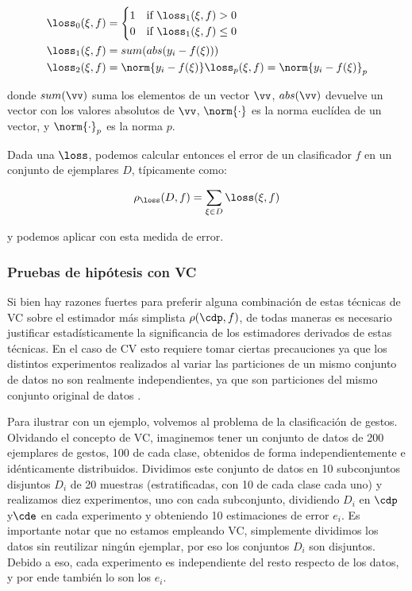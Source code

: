 \begin{align}
  \loss_0(\xi,f) &= \begin{cases}
  1 &\mbox{if } \loss_1(\xi,f) >0 \\  
  0 &\mbox{if } \loss_1(\xi,f) \leq 0      
  \end{cases}\\
  \loss_1(\xi,f) &= sum(abs(y_i-f(\xi))) \\
  \loss_2(\xi,f) &=  \norm{ y_i-f(\xi) } 
  \loss_p(\xi,f) =  \norm{ y_i-f(\xi) }_p 
\end{align}

donde $sum(\vv)$ suma los elementos de un vector $\vv$, $abs(\vv)$ devuelve un vector con los valores absolutos de $\vv$,  $\norm{\cdot}$ es la norma euclídea de un vector, y $\norm{\cdot}_p$ es la norma $p$.

Dada una $\loss$, podemos calcular entonces el error de un clasificador $f$ en un conjunto de ejemplares $D$, típicamente como:

\begin{equation}
\rho_{\loss}(D,f) = \sum_{\xi \in D} \loss(\xi,f)
\end{equation}

y podemos aplicar \cv con esta medida de error.

\subsubsection{Pruebas de hipótesis con VC}

Si bien hay razones fuertes para preferir alguna combinación de estas técnicas de VC sobre el estimador más simplista $\rho(\cdp,f)$, de todas maneras es necesario justificar estadísticamente la significancia de los estimadores derivados de estas técnicas.  En el caso de CV esto requiere tomar ciertas precauciones ya que los distintos experimentos realizados al variar las particiones de un mismo conjunto de datos no son realmente independientes, ya que son particiones del mismo conjunto original de datos \cite{bengio2004,dietterich1998}.

Para ilustrar con un ejemplo, volvemos al problema de la clasificación de gestos. Olvidando el concepto de VC, imaginemos tener un conjunto de datos de 200 ejemplares de gestos, 100 de cada clase, obtenidos de forma independientemente e idénticamente distribuidos. Dividimos este conjunto de datos en 10 subconjuntos disjuntos $D_i$ de 20 muestras (estratificadas, con 10 de cada clase cada uno) y realizamos diez experimentos, uno con cada subconjunto,  dividiendo $D_i$ en $\cdp$ y$\cde$ en cada experimento y obteniendo 10 estimaciones de error $e_i$. Es importante notar que no estamos empleando VC, simplemente dividimos los datos sin reutilizar ningún ejemplar, por eso los conjuntos $D_i$ son disjuntos. Debido a eso, cada experimento es independiente del resto respecto de los datos, y por ende también lo son los $e_i$. 

